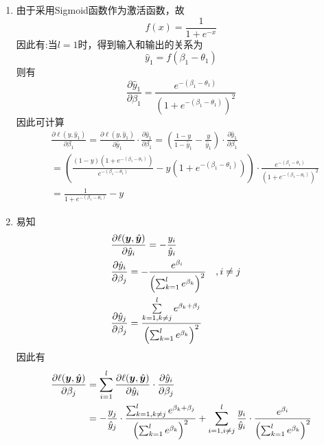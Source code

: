 \documentclass[answers]{exam}  %
\begin{document}
\begin{questions}
\begin{enumerate}
\end{enumerate}


\begin{solution}
	\begin{enumerate}
        \item 由于采用Sigmoid函数作为激活函数，故
        \[f(x)=\frac1{1+e^{-x}}\]
        因此有:当$l=1$时，得到输入和输出的关系为
        \[
            \hat y_1=f(\beta_1-\theta_1)
        \]
        则有
        \[
            \frac{\partial \hat y_1}{\partial \beta_1}=\frac{e^{-(\beta_1-\theta_1)}}{(1+e^{-(\beta_1-\theta_1)})^2}
        \]
        因此可计算
        \[
            \begin{aligned}
                &\frac{\partial{\ell(y,\hat y_1)}}{\partial \beta_1}
                =\frac{\partial\ell{(y,\hat y_1)}}{\partial \hat y_1}\cdot\frac{\partial \hat y_1}{\partial \beta_1}=\left(\frac{1-y}{1-\hat y_1}-\frac y{\hat y_1}\right)\cdot \frac{\partial \hat y_1}{\partial\beta_1}\\
                &=\left(\frac{(1-y)(1+e^{-(\beta_1-\theta_1)})}{e^{-(\beta_1-\theta_1)}}-y(1+e^{-(\beta_1-\theta_1)})\right)\cdot\frac{e^{-(\beta_1-\theta_1)}}{(1+e^{-(\beta_1-\theta_1)})^2}\\
                &=\frac{1}{1+e^{-(\beta_1-\theta_1)}}-y
            \end{aligned}  
        \]
        \item 易知
        \[
            \begin{aligned}
                &\frac{\partial \ell(\boldsymbol{y},\hat{\boldsymbol{y}})}{\partial \hat y_i}=-\frac{y_i}{\hat y_i}\\
                &\frac{\partial \hat y_i}{\partial \beta_j}=-\frac{e^{\beta_i}}{\left(\sum^l_{k=1}e^{\beta_k}\right)^2}&&,i\not=j\\
                &\frac{\partial \hat y_j}{\partial \beta_j}=\frac{\sum\limits^l_{k=1,k\not=j}e^{\beta_k+\beta_j}}{\left(\sum^l_{k=1}e^{\beta_k}\right)^2}
            \end{aligned}  
        \]
        因此有
        \[
            \begin{aligned}    
                \frac{\partial \ell(\vy,\hat\vy)}{\partial\beta_j}
                &=\sum^l_{i=1}\frac{\partial \ell(\vy,\hat\vy)}{\partial \hat y_i}\cdot\frac{\partial \hat y_i}{\partial\beta_{j}}\\
                &=-\frac{y_j}{\hat y_j}\cdot\frac{\sum^l_{k=1,k\not=j}e^{\beta_k+\beta_j}}{\left(\sum^l_{k=1}e^{\beta_k}\right)^2}+\sum^l_{i=1,i\not=j}\frac{y_i}{\hat y_i}\cdot\frac{e^{\beta_i}}{\left(\sum^l_{k=1}e^{\beta_k}\right)^2}\\

\end{aligned}\]
\end{enumerate}
\end{solution}
\end{questions}
\end{document}
